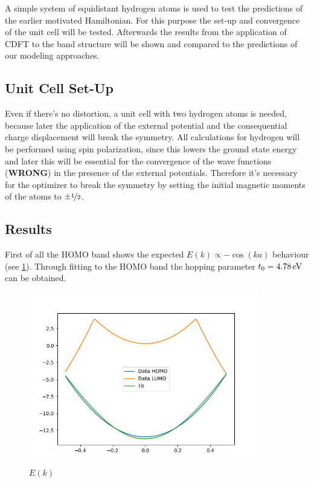 A simple system of equidistant hydrogen atoms is used to test the predictions of the earlier motivated Hamiltonian. For this purpose the set-up and convergence of the unit cell will be tested. Afterwards the results from the application of CDFT to the band structure will be shown and compared to the predictions of our modeling approaches.

\subsection{Unit Cell Set-Up}
Even if there's no distortion, a unit cell with two hydrogen atoms is needed, because later the application of the external potential and the consequential charge displacement will break the symmetry. All calculations for hydrogen will be performed using spin polarization, since this lowers the ground state energy and later this will be essential for the convergence of the wave functions (\textbf{WRONG}) in the presence of the external potentials. Therefore it's necessary for the optimizer to break the symmetry by setting the initial magnetic moments of the atoms to $\pm\nicefrac{1}{2}$. 


\subsection{Results}

First of all the HOMO band shows the expected $E(k)\propto -\cos(ka)$ behaviour (see \cref{image_hydrogen_bandstructure}). Through fitting to the HOMO band the hopping parameter $t_0 = \unit[4.78]{eV}$ can be obtained.

\begin{figure}[!bth]
	\centering
	\includegraphics[width = 10cm]{Images/Hydrogen/hydrogen_bandstructure}
	\caption{$E(k)$}
	\label{image_hydrogen_bandstructure}
\end{figure}

